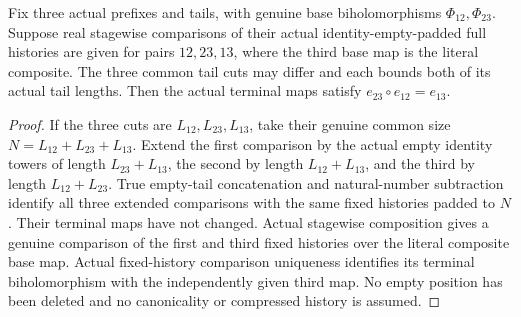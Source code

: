 \begin{theorem}
\label{hir:sharp-actual-curve-common-cut-padding-cocycle}
\leanok
Fix three actual prefixes and tails, with genuine base biholomorphisms
$\Phi_{12},\Phi_{23}$. Suppose real stagewise comparisons of their actual
identity-empty-padded full histories are given for pairs $12,23,13$,
where the third base map is the literal composite. The three common tail
cuts may differ and each bounds both of its actual tail lengths. Then the
actual terminal maps satisfy $e_{23}\circ e_{12}=e_{13}$.
\end{theorem}
\begin{proof}
If the three cuts are $L_{12},L_{23},L_{13}$, take their genuine common size
$N=L_{12}+L_{23}+L_{13}$. Extend the first comparison by the actual empty
identity towers of length $L_{23}+L_{13}$, the second by length
$L_{12}+L_{13}$, and the third by length $L_{12}+L_{23}$. True empty-tail
concatenation and natural-number subtraction identify all three extended
comparisons with the same fixed histories padded to $N$. Their terminal
maps have not changed. Actual stagewise composition gives a genuine
comparison of the first and third fixed histories over the literal composite
base map. Actual fixed-history comparison uniqueness identifies its terminal
biholomorphism with the independently given third map. No empty position
has been deleted and no canonicality or compressed history is assumed.
\end{proof}

